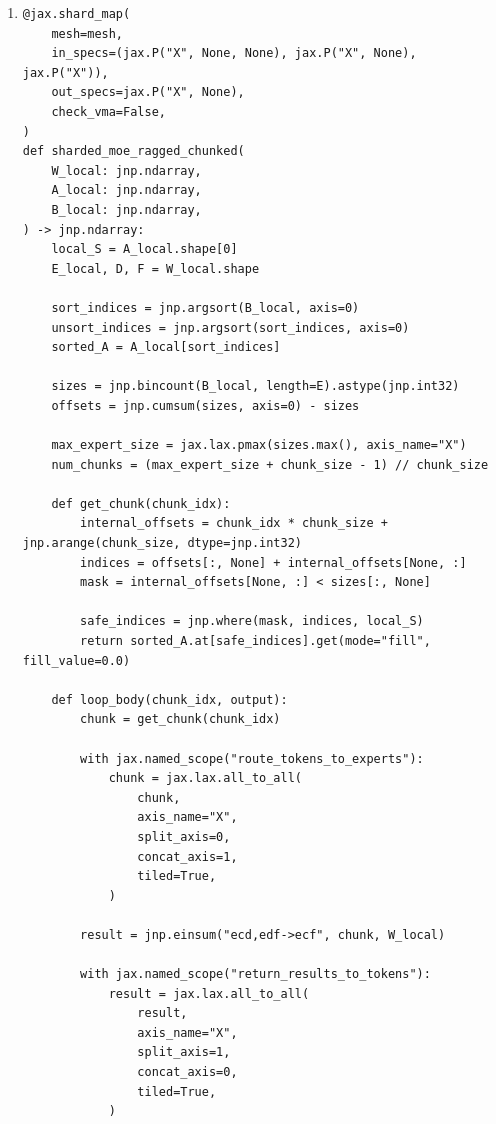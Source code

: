 \documentclass[11pt]{article}
\begin{document}
\begin{enumerate}
\begin{enumerate}[label=\arabic*.]
\begin{lstlisting}[style=pythoncode]
        full_out = jax.lax.psum(local_contrib, "X")

        token_start = jax.lax.axis_index("X") * S_local
        return jax.lax.dynamic_slice(full_out, (token_start, 0), (S_local, F))

    return jax.shard_map(
        local_moe,
        mesh=mesh,
        in_specs=(jax.P("X", None, None), jax.P("X", None), jax.P("X")),
        out_specs=jax.P("X", None),
        check_vma=False,
    )(W, A, B)
\end{lstlisting}

  \item
\begin{lstlisting}[style=pythoncode]
@jax.shard_map(
    mesh=mesh,
    in_specs=(jax.P("X", None, None), jax.P("X", None), jax.P("X")),
    out_specs=jax.P("X", None),
    check_vma=False,
)
def sharded_moe_ragged_chunked(
    W_local: jnp.ndarray,
    A_local: jnp.ndarray,
    B_local: jnp.ndarray,
) -> jnp.ndarray:
    local_S = A_local.shape[0]
    E_local, D, F = W_local.shape

    sort_indices = jnp.argsort(B_local, axis=0)
    unsort_indices = jnp.argsort(sort_indices, axis=0)
    sorted_A = A_local[sort_indices]

    sizes = jnp.bincount(B_local, length=E).astype(jnp.int32)
    offsets = jnp.cumsum(sizes, axis=0) - sizes

    max_expert_size = jax.lax.pmax(sizes.max(), axis_name="X")
    num_chunks = (max_expert_size + chunk_size - 1) // chunk_size

    def get_chunk(chunk_idx):
        internal_offsets = chunk_idx * chunk_size + jnp.arange(chunk_size, dtype=jnp.int32)
        indices = offsets[:, None] + internal_offsets[None, :]
        mask = internal_offsets[None, :] < sizes[:, None]

        safe_indices = jnp.where(mask, indices, local_S)
        return sorted_A.at[safe_indices].get(mode="fill", fill_value=0.0)

    def loop_body(chunk_idx, output):
        chunk = get_chunk(chunk_idx)

        with jax.named_scope("route_tokens_to_experts"):
            chunk = jax.lax.all_to_all(
                chunk,
                axis_name="X",
                split_axis=0,
                concat_axis=1,
                tiled=True,
            )

        result = jnp.einsum("ecd,edf->ecf", chunk, W_local)

        with jax.named_scope("return_results_to_tokens"):
            result = jax.lax.all_to_all(
                result,
                axis_name="X",
                split_axis=1,
                concat_axis=0,
                tiled=True,
            )


\end{lstlisting}
\end{enumerate}
\end{enumerate}
\end{document}
